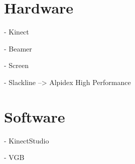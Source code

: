 \section{Hardware}
- Kinect

- Beamer

- Screen

- Slackline --> Alpidex High Performance

\section{Software}
- KinectStudio

- VGB

